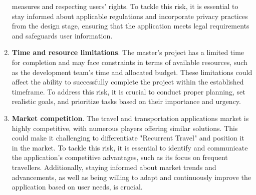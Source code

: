 \documentclass[../memory.tex]{subfiles}
\begin{document}
\begin{enumerate}
	      measures and respecting users' rights. To tackle this risk, it is
	      essential to stay informed about applicable regulations and incorporate
	      privacy practices from the design stage, ensuring that the application
	      meets legal requirements and safeguards user information.
	\item \textbf{Time and resource limitations}. The master's project has a limited time
	      for completion and may face constraints in terms of available resources,
	      such as the development team's time and allocated budget. These
	      limitations could affect the ability to successfully complete the project
	      within the established timeframe. To address this risk, it is crucial to
	      conduct proper planning, set realistic goals, and prioritize tasks based
	      on their importance and urgency.
	\item \textbf{Market competition}. The travel and transportation applications market
	      is highly competitive, with numerous players offering similar solutions.
	      This could make it challenging to differentiate "Recurrent Travel" and
	      position it in the market. To tackle this risk, it is essential to
	      identify and communicate the application's competitive advantages, such as
	      its focus on frequent travellers. Additionally, staying informed about
	      market trends and advancements, as well as being willing to adapt and
	      continuously improve the application based on user needs, is crucial.
\end{enumerate}
\end{document}

